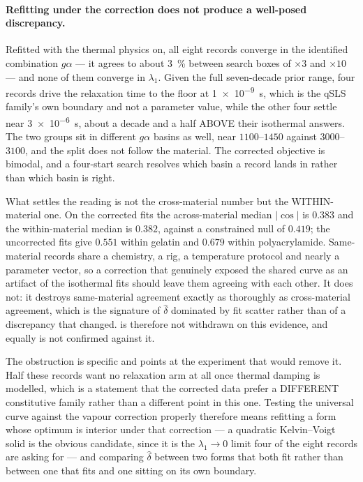 \documentclass[10pt]{article}
\begin{document}
\paragraph{Refitting under the correction does not produce a well-posed discrepancy.} Refitted
with the thermal physics on, all eight records converge in the identified combination $g\alpha$
--- it agrees to about \SI{3}{\percent} between search boxes of $\times3$ and $\times10$ --- and
none of them converge in $\lambda_1$. Given the full seven-decade prior range, four records
drive the relaxation time to the floor at \SI{1e-9}{\second}, which is the qSLS family's own
boundary and not a parameter value, while the other four settle near
\SI{3e-6}{\second}, about a decade and a half ABOVE their isothermal answers. The two groups sit
in different $g\alpha$ basins as well, near $1100$--$1450$ against $3000$--$3100$, and the split
does not follow the material. The corrected objective is bimodal, and a four-start search
resolves which basin a record lands in rather than which basin is right.

What settles the reading is not the cross-material number but the WITHIN-material one. On the
corrected fits the across-material median $\lvert\cos\rvert$ is $0.383$ and the within-material
median is $0.382$, against a constrained null of $0.419$; the uncorrected fits give $0.551$
within gelatin and $0.679$ within polyacrylamide. Same-material records share a chemistry, a
rig, a temperature protocol and nearly a parameter vector, so a correction that genuinely
exposed the shared curve as an artifact of the isothermal fits should leave them agreeing with
each other. It does not: it destroys same-material agreement exactly as thoroughly as
cross-material agreement, which is the signature of $\hat\delta$ dominated by fit scatter rather
than of a discrepancy that changed.  is therefore not withdrawn on this
evidence, and equally is not confirmed against it.

The obstruction is specific and points at the experiment that would remove it. Half these
records want no relaxation arm at all once thermal damping is modelled, which is a statement
that the corrected data prefer a DIFFERENT constitutive family rather than a different point in
this one. Testing the universal curve against the vapour correction properly therefore means
refitting a form whose optimum is interior under that correction --- a quadratic Kelvin--Voigt
solid is the obvious candidate, since it is the $\lambda_1 \to 0$ limit four of the eight
records are asking for --- and comparing $\hat\delta$ between two forms that both fit rather
than between one that fits and one sitting on its own boundary.
\end{document}

